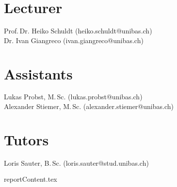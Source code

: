 \documentclass[runningheads,a4paper]{llncs}
\newenvironment{produceProceedings}{}{}
\begin{document}
\begin{produceProceedings}
	\section*{Lecturer}
	Prof.\,Dr. Heiko Schuldt (heiko.schuldt@unibas.ch) \\
	Dr. Ivan Giangreco (ivan.giangreco@unibas.ch)
	\section*{Assistants}
	Lukas Probst, M.\,Sc. (lukas.probst@unibas.ch) \\
	Alexander Stiemer, M.\,Sc. (alexander.stiemer@unibas.ch)
	\section*{Tutors}
	Loris Sauter, B.\,Sc. (loris.sauter@stud.unibas.ch)
	\tableofcontents
\end{produceProceedings}
	
%
\mainmatter
%

 \begin{cbunit}{reportContent.tex}\end{cbunit}
\end{document}
